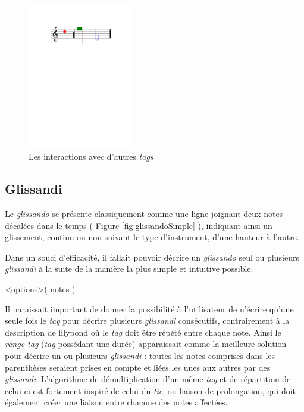 \documentclass{article}
\newenvironment{gmncode}	{\vspace{-2mm}\small\verbatim}{\endverbatim\vspace{-2mm}}
\begin{document}
%
\begin{figure}[h]
\centering
\begin{gmncode}
[
  \cluster<color="red", hdx=1, hdy=3>({a})
  \cluster<size=0.5>({f,c2})
  \noteFormat<color="purple">
  \headsReverse
  \cluster<color="green", size=2>({f, g2})
  \cluster<"blue">({d1/2, g})
]
\end{gmncode}
\includegraphics[width=45mm]{img/partitions/clusterInteractions.pdf}
\caption{Les interactions avec d'autres \emph{tags}}
\label{fig:clusterInteractions}
\end{figure}
%


\subsection{Glissandi}\label{subsec:glissando}

Le \emph{glissando} se présente classiquement comme une ligne joignant deux notes décalées dans le temps ( Figure \ref{fig:glissandoSimple} ), indiquant ainsi un glissement, continu ou non suivant le type d'instrument, d'une hauteur à l'autre.

Dans un souci d'efficacité, il fallait pouvoir décrire un \emph{glissando} seul ou plusieurs \emph{glissandi} à la suite de la manière la plus simple et intuitive possible. 

\begin{gmncode}
\glissando<options>( notes )
\end{gmncode}

Il paraissait important de donner la possibilité à l'utilisateur de n'écrire qu'une seule fois le \emph{tag} pour décrire plusieurs \emph{glissandi} consécutifs, contrairement à la description de lilypond où le \emph{tag} doit être répété entre chaque note. Ainsi le \emph{range-tag} (\emph{tag} possédant une durée) apparaissait comme la meilleure solution pour décrire un ou plusieurs \emph{glissandi} : toutes les notes comprises dans les parenthèses seraient prises en compte et liées les unes aux autres par des \emph{glissandi}. L'algorithme de démultiplication d'un même \emph{tag} et de répartition de celui-ci est fortement inspiré de celui du \emph{tie}, ou liaison de prolongation, qui doit également créer une liaison entre chacune des notes affectées.
\\
\end{document}
